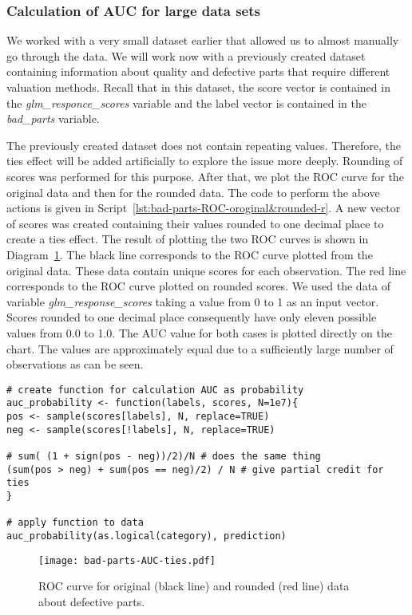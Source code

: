 \documentclass[]{scrreprt}
\begin{document}
\subsubsection{Calculation of AUC for large data sets}
We worked with a very small dataset earlier that allowed us to almost manually go through the data. We will work now with a previously created dataset containing information about quality and defective parts that require different valuation methods. Recall that in this dataset, the score vector is contained in the \textit{glm\_responce\_scores} variable and the label vector is contained in the \textit{bad\_parts} variable.

The previously created dataset does not contain repeating values. Therefore, the ties effect will be added artificially to explore the issue more deeply. Rounding of scores was performed for this purpose. After that, we plot the ROC curve for the original data and then for the rounded data. The code to perform the above actions is given in Script~\ref{lst:bad-parts-ROC-oroginal&rounded-r}. A new vector of scores was created containing their values rounded to one decimal place to create a ties effect. The result of plotting the two ROC curves is shown in Diagram~\ref{fig:bad-parts-ROC-original&rounded-r}. The black line corresponds to the ROC curve plotted from the original data. These data contain unique scores for each observation. The red line corresponds to the ROC curve plotted on rounded scores. We used the data of variable \textit{glm\_response\_scores} taking a value from 0 to 1 as an input vector. Scores rounded to one decimal place consequently have only eleven possible values from 0.0 to 1.0. The AUC value for both cases is plotted directly on the chart. The values are approximately equal due to a sufficiently large number of observations as can be seen.
%
\begin{lstlisting}[float=htp, caption = Plotting the ROC curve on the original (black line) and rounded (red line) defective parts data, firstnumber=1, label= lst:bad-parts-ROC-oroginal&rounded-r]
# create function for calculation AUC as probability
auc_probability <- function(labels, scores, N=1e7){
pos <- sample(scores[labels], N, replace=TRUE)
neg <- sample(scores[!labels], N, replace=TRUE)

# sum( (1 + sign(pos - neg))/2)/N # does the same thing
(sum(pos > neg) + sum(pos == neg)/2) / N # give partial credit for ties
}

# apply function to data
auc_probability(as.logical(category), prediction)
\end{lstlisting}
%
\begin{figure}[htp]
	\centering
	\texttt{[image: bad-parts-AUC-ties.pdf]}
	\caption{ROC curve for original (black line) and rounded (red line) data about defective parts.}
	\label{fig:bad-parts-ROC-original&rounded-r}
\end{figure}
%
\end{document}
